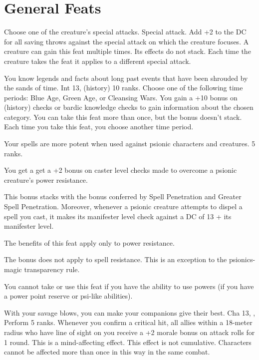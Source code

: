 \section{General Feats}

{Choose one of the creature's special attacks.}
{Special attack.}
{Add +2 to the DC for all saving throws against the special attack on which the creature focuses.}
{}
{A creature can gain this feat multiple times. Its effects do not stack. Each time the creature takes the feat it applies to a different special attack.}

{You know legends and facts about long past events that have been shrouded by the sands of time.}
{Int 13,  (history) 10 ranks.}
{Choose one of the following time periods: Blue Age, Green Age, or Cleansing Wars. You gain a +10 bonus on  (history) checks or bardic knowledge checks to gain information about the chosen category.}{}
{You can take this feat more than once, but the bonus doesn't stack. Each time you take this feat, you choose another time period.}

{Your spells are more potent when used against psionic characters and creatures.}
{ 5 ranks.}
{You get a get a +2 bonus on caster level checks made to overcome a psionic creature's power resistance.

This bonus stacks with the bonus conferred by Spell Penetration and Greater Spell Penetration. Moreover, whenever a psionic creature attempts to dispel a spell you cast, it makes its manifester level check against a DC of 13 + its manifester level.

The benefits of this feat apply only to power resistance.

The bonus does not apply to spell resistance. This is an exception to the psionics-magic transparency rule.}{}
{You cannot take or use this feat if you have the ability to use powers (if you have a power point reserve or psi-like abilities).}

{With your savage blows, you can make your companions give their best.}
{Cha 13, , Perform 5 ranks.}
{Whenever you confirm a critical hit, all allies within a 18-meter radius who have line of sight on you receive a +2 morale bonus on attack rolls for 1 round. This is a mind-affecting effect. This effect is not cumulative. Characters cannot be affected more than once in this way in the same combat.}{}{}


